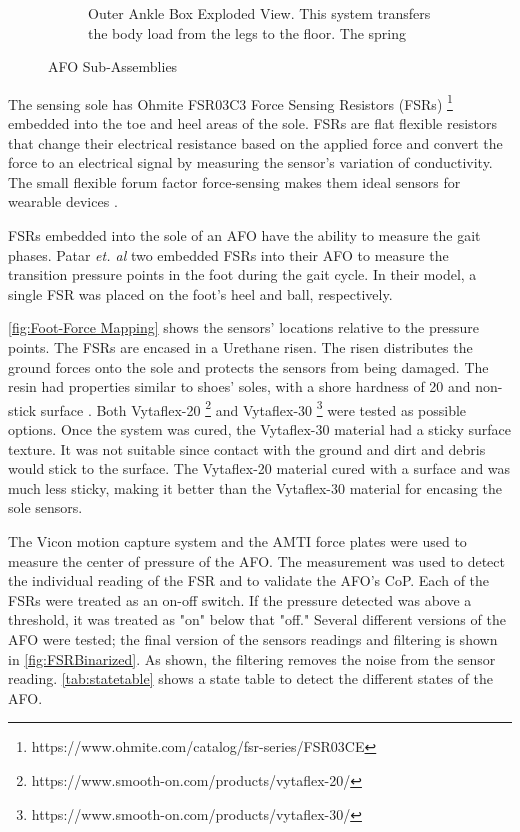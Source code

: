 \begin{figure}[h!]
\begin{subfigure}[b]{.45\textwidth}
        \caption{Outer Ankle Box Exploded View. This system transfers the body load from the legs to the floor. The spring }
        \label{fig:Outer Ankle Box fig}
    \end{subfigure}%
    \caption{AFO Sub-Assemblies}
    \label{fig:AFO Sub-Assemblies}
\end{figure}


The sensing sole has Ohmite FSR03C3 Force Sensing Resistors (FSRs) \footnote{https://www.ohmite.com/catalog/fsr-series/FSR03CE} embedded into the toe and heel areas of the sole. FSRs are flat flexible resistors that change their electrical resistance based on the applied force \cite{yaniger1991force} and convert the force to an electrical signal by measuring the sensor's variation of conductivity. The small flexible forum factor force-sensing makes them ideal sensors for wearable devices \cite{giovanelli2016force}.    

FSRs embedded into the sole of an AFO have the ability to measure the gait phases. Patar \textit{et. al} two embedded FSRs into their AFO to measure the transition pressure points in the foot during the gait cycle\cite{ab2014system}. In their model, a single FSR was placed on the foot's heel and ball, respectively.  

\autoref{fig:Foot-Force Mapping} shows the sensors' locations relative to the pressure points. The FSRs are encased in a Urethane risen. The risen distributes the ground forces onto the sole and protects the sensors from being damaged. The resin had properties similar to shoes' soles, with a shore hardness of 20 and non-stick surface \cite{Vytaflex20Website}. Both Vytaflex-20 \footnote{https://www.smooth-on.com/products/vytaflex-20/} and Vytaflex-30 \footnote{https://www.smooth-on.com/products/vytaflex-30/} were tested as possible options. Once the system was cured, the Vytaflex-30 material had a sticky surface texture. It was not suitable since contact with the ground and dirt and debris would stick to the surface. The Vytaflex-20 material cured with a surface and was much less sticky, making it better than the Vytaflex-30 material for encasing the sole sensors. 

The Vicon motion capture system and the AMTI force plates were used to measure the center of pressure of the AFO.  The measurement was used to detect the individual reading of the FSR and to validate the AFO's CoP. Each of the FSRs were treated as an on-off switch. If the pressure detected was above a threshold, it was treated as "on" below that  "off."  Several different versions of the AFO were tested; the final version of the sensors readings and filtering is shown in \autoref{fig:FSRBinarized}. As shown, the filtering removes the noise from the sensor reading. \autoref{tab:statetable} shows a state table to detect the different states of the AFO. 

